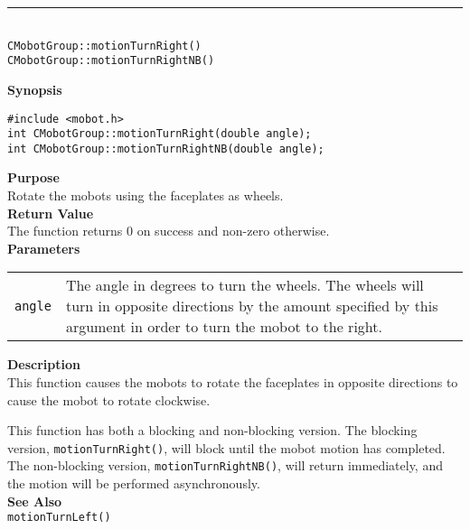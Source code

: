 \noindent
\vspace{5pt}
\rule{4.5in}{0.015in}\\
\noindent
{\LARGE \texttt{CMobotGroup::motionTurnRight()}}\\
{\LARGE \texttt{CMobotGroup::motionTurnRightNB()}}\\
{}

\noindent
{\bf Synopsis}
\vspace{-8pt}
\begin{verbatim}
#include <mobot.h>
int CMobotGroup::motionTurnRight(double angle);
int CMobotGroup::motionTurnRightNB(double angle);
\end{verbatim}

\noindent
{\bf Purpose}\\
Rotate the mobots using the faceplates as wheels.\\

\noindent
{\bf Return Value}\\
The function returns 0 on success and non-zero otherwise.\\

\noindent
{\bf Parameters}\\
\vspace{-0.1in}
\begin{description}
\item               
\begin{tabular}{p{10 mm}p{145 mm}}
\texttt{angle} & The angle in degrees to turn the wheels. The wheels will turn in opposite directions by the amount specified by this argument in order to turn the mobot to the right. \\
\end{tabular}
\end{description}

\noindent
{\bf Description}\\
This function causes the mobots to rotate the faceplates in opposite directions
to cause the mobot to rotate clockwise.

This function has both a blocking and non-blocking version.
The blocking version, \texttt{motionTurnRight()}, will block until the
mobot motion has completed. The non-blocking version, \texttt{motionTurnRightNB()},
will return immediately, and the motion will be performed asynchronously.\\

\noindent
{\bf See Also}\\
\texttt{motionTurnLeft()}


